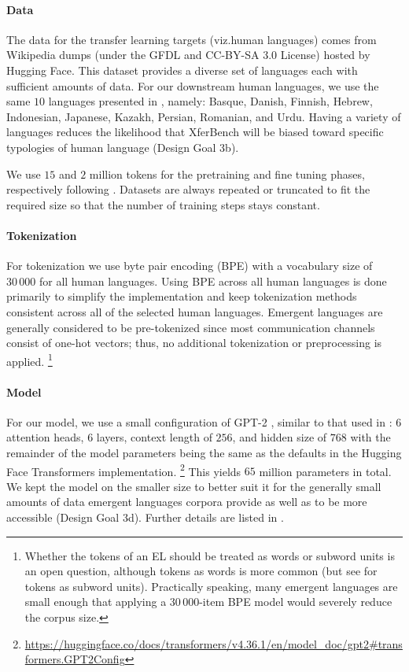 \paragraph{Data}
The data for the transfer learning targets (viz.\@ human languages) comes from Wikipedia dumps \citep{wikidump} (under the GFDL and CC-BY-SA 3.0 License) hosted by Hugging Face\footnotemark{}.
This dataset provides a diverse set of languages each with sufficient amounts of data.
For our downstream human languages, we use the same $10$ languages presented in \citet{yao2022linking}, namely:
  Basque,
  Danish,
  Finnish,
  Hebrew,
  Indonesian,
  Japanese,
  Kazakh,
  Persian,
  Romanian,
  and Urdu.
Having a variety of languages reduces the likelihood that XferBench will be biased toward specific typologies of human language (Design Goal 3b).

We use $15$ and $2$ million tokens for the pretraining and fine tuning phases, respectively following \citet{yao2022linking}.
Datasets are always repeated or truncated to fit the required size so that the number of training steps stays constant.

\paragraph{Tokenization}
For tokenization we use byte pair encoding (BPE) \citep{Gage1994ANA} with a vocabulary size of $30\,000$ for all human languages.
Using BPE across all human languages is done primarily to simplify the implementation and keep tokenization methods consistent across all of the selected human languages.
Emergent languages are generally considered to be pre-tokenized since most communication channels consist of one-hot vectors;
  thus, no additional tokenization or preprocessing is applied.
\unskip\footnote{%
  Whether the tokens of an EL should be treated as words or subword units is an open question, although tokens as words is more common (but see \citet{ueda2023on} for tokens as subword units).
  Practically speaking, many emergent languages are small enough that applying a $30\,000$-item BPE model would severely reduce the corpus size.
}
  
\paragraph{Model}

For our model, we use a small configuration of GPT-2 \citep{radford2019language}, similar to that used in \citet{yao2022linking}:
  $6$ attention heads,
  $6$ layers,
  context length of $256$,
  and hidden size of $768$
  with the remainder of the model parameters being the same as the defaults in the Hugging Face Transformers implementation.
  \unskip\footnote{\scriptsize\url{https://huggingface.co/docs/transformers/v4.36.1/en/model_doc/gpt2\#transformers.GPT2Config}}
This yields $65$ million parameters in total.
We kept the model on the smaller size to better suit it for the generally small amounts of data emergent languages corpora provide as well as to be more accessible (Design Goal 3d).
Further details are listed in .

